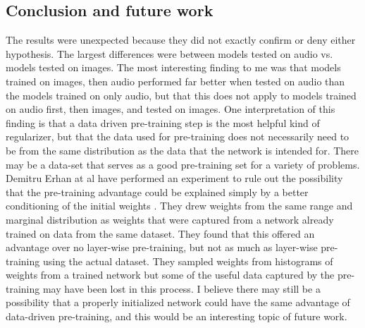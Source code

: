 \documentclass[12pt]{article}
\begin{document}
\begin{doublespacing}
	\subsection{Conclusion and future work}
The results were unexpected because they did not exactly confirm or deny either hypothesis. The largest differences were between models tested on audio vs. models tested on images. The most interesting finding to me was that models trained on images, then audio performed far better when tested on audio than the models trained on only audio, but that this does not apply to models trained on audio first, then images, and tested on images. One interpretation of this finding is that a data driven pre-training step is the most helpful kind of regularizer, but that the data used for pre-training does not necessarily need to be from the same distribution as the data that the network is intended for. There may be a data-set that serves as a good pre-training set for a variety of problems. Demitru Erhan at al have performed an experiment to rule out the possibility that the pre-training advantage could be explained simply by a better conditioning of the initial weights \cite{erhan2009difficulty}. They drew weights from the same range and marginal distribution as weights that were captured from a network already trained on data from the same dataset. They found that this offered an advantage over no layer-wise pre-training, but not as much as layer-wise pre-training using the actual dataset. They sampled weights from histograms of weights from a trained network but some of the useful data captured by the pre-training may have been lost in this process. I believe there may still be a possibility that a properly initialized network could have the same advantage of data-driven pre-training, and this would be an interesting topic of future work.


\end{doublespacing}
\end{document}
